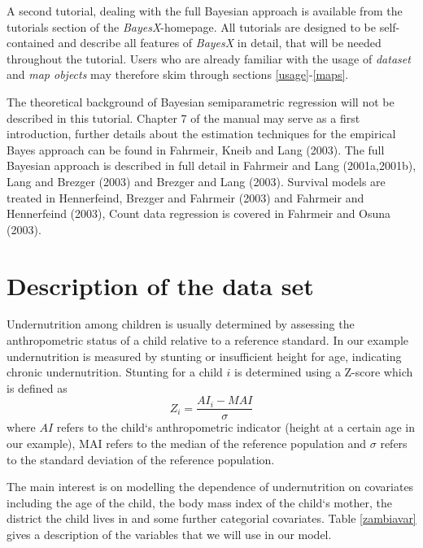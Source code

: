 \documentclass{article}
\begin{document}
A second tutorial, dealing with the full Bayesian approach is
available from the tutorials section of the {\it BayesX}-homepage.
All tutorials are designed to be self-contained and describe all
features of {\it BayesX} in detail, that will be needed throughout
the tutorial. Users who are already familiar with the usage of
{\it dataset} and {\it map objects} may therefore skim through
sections \ref{usage}-\ref{maps}.

The theoretical background of Bayesian semiparametric regression
will not be described in this tutorial. Chapter 7 of the manual
may serve as a first introduction, further details about the
estimation techniques for the empirical Bayes approach can be
found in Fahrmeir, Kneib and Lang (2003).\nocite{fahkne03} The
full Bayesian approach is described in full detail in Fahrmeir and
Lang (2001a,2001b),\nocite{fahlan01a} \nocite{fahlan01b} Lang and
Brezger (2003) and Brezger and Lang (2003).\nocite{lanbre03}
Survival models are treated in Hennerfeind, Brezger and Fahrmeir
(2003)\nocite{henfah03} and Fahrmeir and Hennerfeind
(2003)\nocite{fahhen03}, Count data regression is covered in
Fahrmeir and Osuna (2003)\nocite{fahosu03}.

\section{Description of the data set}

Undernutrition among children is usually determined by assessing
the anthropometric status of a child relative to a reference
standard. In our example undernutrition is measured by stunting or
insufficient height for age, indicating chronic undernutrition.
Stunting for a child $i$ is determined using a Z-score which is
defined as
\[Z_i = \frac{AI_i-MAI}{\sigma}\]
where $AI$ refers to the child`s anthropometric indicator (height
at a certain age in our example), MAI refers to the median of the
reference population and $\sigma$ refers to the standard deviation
of the reference population.

The main interest is on modelling the dependence of undernutrition
on covariates including the age of the child, the body mass index
of the child`s mother, the district the child lives in and some
further categorial covariates. Table \ref{zambiavar} gives a
description of the variables that we will use in our model.
\end{document}
